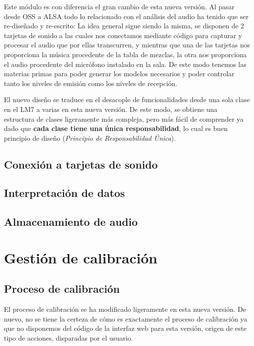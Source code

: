 Este módulo es con diferencia el gran cambio de esta nueva versión. Al pasar desde OSS a ALSA todo lo relacionado con el análisis del audio ha tenido que ser re-diseñado y re-escrito: La idea general sigue siendo la misma, se disponen de 2 tarjetas de sonido a las cuales nos conectamos mediante código para capturar y procesar el audio que por ellas transcurren, y mientras que una de las tarjetas nos proporciona la música procedente de la tabla de mezclas, la otra nos proporciona el audio procedente del micrófono instalado en la sala. De este modo tenemos las materias primas para poder generar los modelos necesarios y poder controlar tanto los niveles de emisión como los niveles de recepción.

El nuevo diseño se traduce en el desacople de funcionalidades desde una sola clase en el LM7 a varias en esta nueva versión. De este modo, se obtiene una estructura de clases ligeramente más compleja, pero más fácil de comprender ya dado que \textbf{cada clase tiene una única responsabilidad}, lo cual es buen principio de diseño (\textit{Principio de Responsabilidad Única}).

\subsection{Conexión a tarjetas de sonido}

\subsection{Interpretación de datos}

\subsection{Almacenamiento de audio}


\clearpage
\section{Gestión de calibración}

\subsection{Proceso de calibración}

El proceso de calibración se ha modificado ligeramente en esta nueva versión. De nuevo, no se tiene la certeza de cómo es exactamente el proceso de calibración ya que no disponemos del código de la interfaz web para esta versión, origen de este tipo de acciones, disparadas por el usuario.

